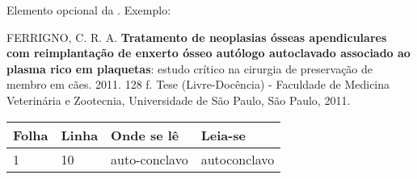 \documentclass[pretext-section.tex]{subfiles}
\begin{document}
    \begin{errata}
    Elemento opcional da \textcite{NBR14724:2011}. Exemplo:
    
    \vspace{\onelineskip}
    
    FERRIGNO, C. R. A. \textbf{Tratamento de neoplasias ósseas apendiculares com
    reimplantação de enxerto ósseo autólogo autoclavado associado ao plasma
    rico em plaquetas}: estudo crítico na cirurgia de preservação de membro em
    cães. 2011. 128 f. Tese (Livre-Docência) - Faculdade de Medicina Veterinária e
    Zootecnia, Universidade de São Paulo, São Paulo, 2011.
    
    \begin{table}[htb]
    \center
    \footnotesize
    \begin{tabular}{|p{1.4cm}|p{1cm}|p{3cm}|p{3cm}|}
      \hline
       \textbf{Folha} & \textbf{Linha}  & \textbf{Onde se lê}  & \textbf{Leia-se}  \\
        \hline
        1 & 10 & auto-conclavo & autoconclavo\\
       \hline
    \end{tabular}
    \end{table}
    
    \end{errata}
    
\end{document}
